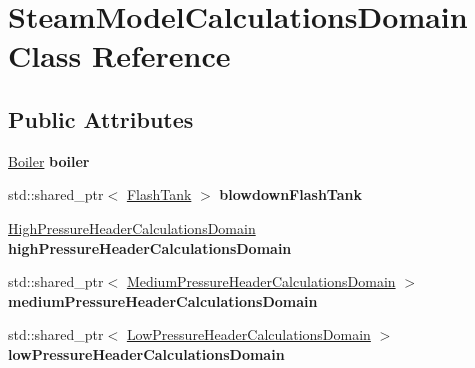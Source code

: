 \hypertarget{class_steam_model_calculations_domain}{}\section{Steam\+Model\+Calculations\+Domain Class Reference}
\label{class_steam_model_calculations_domain}
\subsection*{Public Attributes}
\begin{DoxyCompactItemize}
\item 
\mbox{\label{class_steam_model_calculations_domain_acedf8e8db1891ef3b2cb19446bc72bd3}} 
\hyperlink{class_boiler}{Boiler} {\bfseries boiler}
\item 
\mbox{\label{class_steam_model_calculations_domain_a8e077c51dd3ba9d9a9a283991ca62242}} 
std\+::shared\+\_\+ptr$<$ \hyperlink{class_flash_tank}{Flash\+Tank} $>$ {\bfseries blowdown\+Flash\+Tank}
\item 
\mbox{\label{class_steam_model_calculations_domain_a519d99d333218d920b32edccc5497901}} 
\hyperlink{class_high_pressure_header_calculations_domain}{High\+Pressure\+Header\+Calculations\+Domain} {\bfseries high\+Pressure\+Header\+Calculations\+Domain}
\item 
\mbox{\label{class_steam_model_calculations_domain_a1366a24c8dd78f0373b118e012c196c0}} 
std\+::shared\+\_\+ptr$<$ \hyperlink{class_medium_pressure_header_calculations_domain}{Medium\+Pressure\+Header\+Calculations\+Domain} $>$ {\bfseries medium\+Pressure\+Header\+Calculations\+Domain}
\item 
\mbox{\label{class_steam_model_calculations_domain_a5b2e2deb36a315cf5f6f454670682711}} 
std\+::shared\+\_\+ptr$<$ \hyperlink{class_low_pressure_header_calculations_domain}{Low\+Pressure\+Header\+Calculations\+Domain} $>$ {\bfseries low\+Pressure\+Header\+Calculations\+Domain}
\item 
\mbox{\label{class_steam_model_calculations_domain_a3f631fccb3cc8f75d4932d6a1f34fc53}} 

\end{DoxyCompactItemize}
